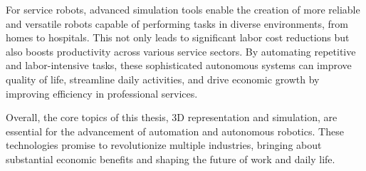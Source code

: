 For service robots, advanced simulation tools enable the creation of more reliable and versatile robots capable of performing tasks in diverse environments, from homes to hospitals. This not only leads to significant labor cost reductions but also boosts productivity across various service sectors. By automating repetitive and labor-intensive tasks, these sophisticated autonomous systems can improve quality of life, streamline daily activities, and drive economic growth by improving efficiency in professional services.

Overall, the core topics of this thesis, 3D representation and simulation, are essential for the advancement of automation and autonomous robotics. These technologies promise to revolutionize multiple industries, bringing about substantial economic benefits and shaping the future of work and daily life.